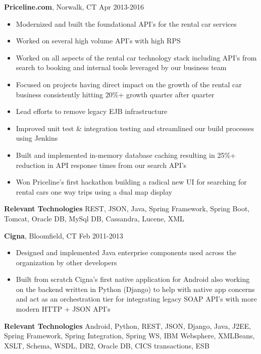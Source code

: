 \documentclass[a4paper,online]{adcv}
\begin{document}
\begin{adcvtabletwo}
  \adcvrowskip
  {\textbf{Priceline.com}, Norwalk, CT}
   {Apr 2013-2016}
  \begin{itemize}
    \item Modernized and built the foundational API's for the rental car services
    \item Worked on several high volume API's with high RPS
    \item Worked on all aspects of the rental car technology stack including API's from search to booking and internal tools leveraged by our business team
    \item Focused on projects having direct impact on the growth of the rental car business consistently hitting 20\%+ growth quarter after quarter
    \item Lead efforts to remove legacy EJB infrastructure
    \item Improved unit test \& integration testing and streamlined our build processes using Jenkins
    \item Built and implemented in-memory database caching resulting in 25\%+ reduction in API response times from our search API's
    \item Won Priceline's first hackathon building a radical new UI for searching for rental cars one way trips using a dual map display
  \end{itemize}
  \adcvrowskip
  \textbf{Relevant Technologies} REST, JSON, Java, Spring Framework, Spring Boot, Tomcat, Oracle DB, MySql DB, Cassandra, Lucene, XML

  \adcvrowskip
  {\textbf{Cigna}, Bloomfield, CT}
   {Feb 2011-2013}
  \begin{itemize}
    \item Designed and implemented Java enterprise components used across the organization by other developers
    \item Built from scratch Cigna's first native application for Android also working on the backend written in Python (Django) to help with native app concerns and act as an orchestration tier for integrating legacy SOAP API's with more modern HTTP + JSON API's
  \end{itemize}
  \adcvrowskip
  \textbf{Relevant Technologies} Android, Python, REST, JSON, Django, Java, J2EE, Spring Framework, Spring Integration, Spring WS, IBM Websphere, XMLBeans, XSLT, Schema, WSDL, DB2, Oracle DB, CICS transactions, ESB
  

\end{adcvtabletwo}
\end{document}
